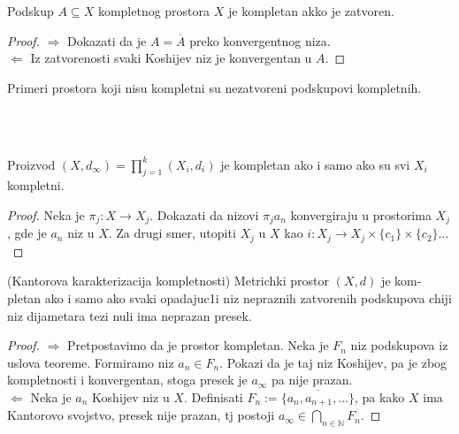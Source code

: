 \documentclass[a4paper,12pt]{article}
\newcommand{\NN}{\mathbb{N}}
\newcommand{\psj}{\subseteq}
\begin{document}
\begin{tvr}
Podskup $A \psj X$ kompletnog prostora $X$ je kompletan akko je zatvoren.
\end{tvr}
\begin{proof}
$\boxed{\Rightarrow}$ Dokazati da je $A = \overline{A}$ preko konvergentnog niza.\\
$\boxed{\Leftarrow}$ Iz zatvorenosti svaki Koshijev niz je konvergentan u $A$.
\end{proof}

\begin{nap}
Primeri prostora koji nisu kompletni su nezatvoreni podskupovi komple\-tnih.
\end{nap}
\\ \\
\begin{tvr}
Proizvod $(X, d_{\infty}) = \prod_{j=1}^{k} (X_i, d_i)$ je kompletan ako i samo ako su svi $X_i$ kompletni.
\end{tvr}
\begin{proof}
Neka je $\pi_j : X \to X_j$. Dokazati da nizovi $\pi_j a_n$ konvergiraju u prostorima $X_j$, gde je $a_n$ niz u $X$. Za drugi smer, utopiti $X_j$ u $X$
	kao $i:X_j \to X_j\times \{c_1\} \times \{c_2\} \dotso$
\end{proof}

\begin{tma}
(Kantorova karakterizacija kompletnosti) Metrichki prostor $(X,d)$ je kom-pletan ako i samo ako svaki opadajuc1i niz nepraznih zatvorenih podskupova chiji niz dijametara tezi nuli ima neprazan presek.
\end{tma}
\begin{proof}
$\boxed{\Rightarrow}$ Pretpostavimo da je prostor kompletan. Neka je $F_n$ niz podskupova iz uslova teoreme. Formiramo niz $a_n \in F_n$. Pokazi da je taj niz Koshijev, pa je zbog kompletnosti i konvergentan, stoga presek je $a_{\infty}$ pa nije prazan. \\
$\boxed{\Leftarrow}$ Neka je $a_n$ Koshijev niz u $X$. Definisati $F_n := \overline{\{a_n ,a_{n+1}, ...\}}$, pa kako $X$ ima Kantorovo svojstvo, presek nije prazan, tj postoji $a_{\infty} \in \bigcap_{n \in \NN} F_n$.
\end{proof}
\end{document}

